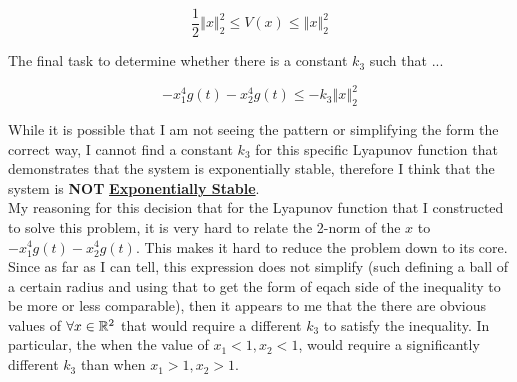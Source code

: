 $$
\frac{1}{2} \left\Vert x \right\Vert_2^2 \leq V(x) \leq \left\Vert x \right\Vert_2^2
$$


\noindent The final task to determine whether there is a constant $k_3$ such that ...

$$
- x_1^4g(t) -x_2^4g(t) \leq -k_3 \left\Vert x \right\Vert_2^2
$$


\noindent While it is possible that I am not seeing the pattern or simplifying the form the correct way, I cannot find a constant $k_3$ for this specific Lyapunov function that demonstrates that the system is exponentially stable, therefore I think that the system is \textbf{NOT} \underline{\textbf{Exponentially Stable}}. \\

\noindent My reasoning for this decision that for the Lyapunov function that I constructed to solve this problem, it is very hard to relate the 2-norm of the $x$ to $- x_1^4g(t) -x_2^4g(t)$. This makes it hard to reduce the problem down to its core. Since as far as I can tell, this expression does not simplify (such defining a ball of a certain radius and using that to get the form of eqach side of the inequality to be more or less comparable), then it appears to me that the there are obvious values of $\forall x \in \mathbb{R}^2$ that would require a different $k_3$ to satisfy the inequality. In particular, the when the value of $x_1<1, x_2 <1$, would require a significantly different $k_3$ than when $x_1 >1, x_2 >1$.
